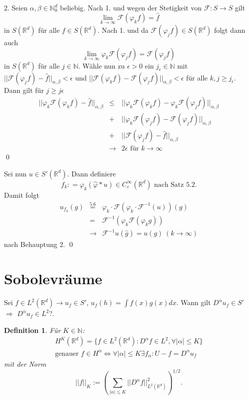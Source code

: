 \documentclass[12pt]{extreport} %
\newtheorem{Definition}[Satz]{Definition}
\numberwithin{equation}{section}
\newcommand{\R}{\mathbb{R}} %
\newcommand{\N}{\mathbb{N}} %
\newcommand{\f}{\hat{f}}
\newcommand{\g}{\hat{g}}
\newcommand{\F}{\mathcal{F}}
\newcommand{\m}{\cdot}
\begin{document}
	2. Seien $\alpha,\beta\in \N_0^d$ beliebig. Nach 1. und wegen der Stetigkeit von $\F: S\rightarrow S$ gilt
	$$\lim\limits_{k\rightarrow\infty}\F(\varphi_k f) = \f$$ 
	in $S(\R^d)$ für alle $f\in S(\R^d)$. Nach 1. und da $\F(\varphi_j f)\in S(\R^d)$ folgt dann auch 
	$$\lim\limits_{k\rightarrow\infty}\varphi_k \F(\varphi_j f) = \F(\varphi_j f)$$
	in $S(\R^d)$ für alle $j\in \N$. Wähle nun zu $\epsilon>0$ ein $j_\epsilon\in \N$ mit $||\F(\varphi_j f)-\f||_{\alpha,\beta} <\epsilon$ und $||\F(\varphi_k f)-\F(\varphi_j f)||_{\alpha,\beta}<\epsilon$ für alle $k,j\geq j_\epsilon$. Dann gilt für $j\geq j\epsilon$
	\begin{eqnarray}
		||\varphi_k\F(\varphi_k f)-\f||_{\alpha,\beta}&\leq & ||\varphi_k\F(\varphi_k f) - \varphi_k\F(\varphi_j f)||_{\alpha,\beta}\nonumber\\
		&+& ||\varphi_k\F(\varphi_j f) - \F(\varphi_j f)||_{\alpha,\beta}\nonumber\\
		&+& ||\F(\varphi_j f) - \f||_{\alpha,\beta}\nonumber\\
		&\rightarrow& 2\epsilon \text{ für } k\rightarrow\infty\nonumber
	\end{eqnarray} %
	\qed
	
	Sei nun $u\in S'(\R^d)$. Dann definiere 
	$$f_k: = \varphi_k(\hat{\varphi}* u)\in C_c^\infty(\R^d) \text{ nach Satz 5.2}.$$
	Damit folgt 
	\begin{eqnarray}
		u_{f_k}(g) &\overset{\text{5.6}}{=}& \varphi_k\m\F(\varphi_k\m\F^{-1}(u))(g) \nonumber\\
		&=& \F^{-1}(\varphi_k\F(\varphi_k g))\nonumber\\
		&\rightarrow& \F^{-1}u(\g) = u(g)~(k\rightarrow\infty)\nonumber
	\end{eqnarray}
	nach Behauptung 2.
	\qed

	\newpage
	
	\section{Sobolevräume}
	
	Sei $f\in L^2(\R^d)\rightarrow u_f\in S'$, $u_f(h) =\int f(x)g(x) dx$. Wann gilt $D^\alpha u_f\in S'$ $\Rightarrow$ $D^\alpha u_f \in L^2$?.
	
	\begin{Definition}
		Für $K\in \N$: 
		\begin{eqnarray}
			H^K(\R^d) =\{f\in L^2(\R^d): D^\alpha f\in L^2, \forall |\alpha|\leq K \}\nonumber\\
			\text{genauer } f\in H^\alpha\Leftrightarrow \forall|\alpha|\leq K\exists f_\alpha: U-f=D^\alpha u_f\nonumber
		\end{eqnarray}
		mit der Norm
		$$||f||_K:= \left(\sum_{|\alpha|\leq K}||D^\alpha f||_{L^2(\R^d)}^2 \right)^{1/2}.$$
	\end{Definition}
	
\end{document}
